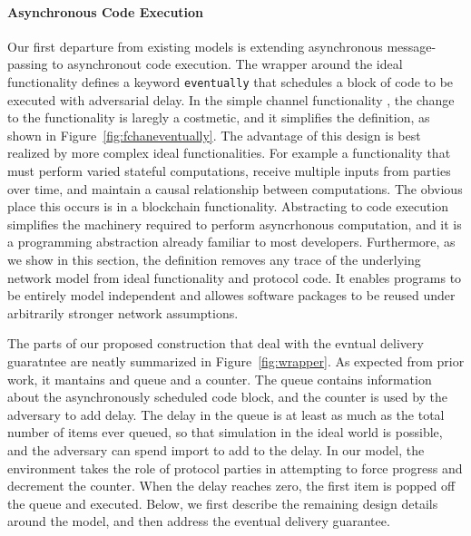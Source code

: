 \paragraph{Asynchronous Code Execution} 
Our first departure from existing models is extending asynchronous message-passing to asynchronout code execution.
The wrapper around the ideal functionality defines a keyword \texttt{eventually} that schedules a block of code to be executed with adversarial delay.
In the simple channel functionality \Fchan, the change to the functionality is laregly a costmetic, and it simplifies the definition, as shown in Figure~\ref{fig:fchaneventually}.
The advantage of this design is best realized by more complex ideal functionalities. 
For example a functionality that must perform varied stateful computations, receive multiple inputs from parties over time, and maintain a causal relationship between computations. 
The obvious place this occurs is in a blockchain functionality. 
Abstracting to code execution simplifies the machinery required to perform asyncrhonous computation, and it is a programming abstraction already familiar to most developers.
Furthermore, as we show in this section, the definition removes any trace of the underlying network model from ideal functionality and protocol code.
It enables programs to be entirely model independent and allowes software packages to be reused under arbitrarily stronger network assumptions.


The parts of our proposed construction that deal with the evntual delivery guaratntee are neatly summarized in Figure~\ref{fig:wrapper}.
As expected from prior work, it mantains and queue and a counter.
The queue contains information about the asynchronously scheduled code block, and the counter is used by the adversary to add delay.
The delay in the queue is at least as much as the total number of items ever queued, so that simulation in the ideal world is possible, and the adversary can spend import to add to the delay.
In our model, the environment takes the role of protocol parties in attempting to force progress and decrement the counter.
When the delay reaches zero, the first item is popped off the queue and executed. 
Below, we first describe the remaining design details around the model, and then address the eventual delivery guarantee. 

